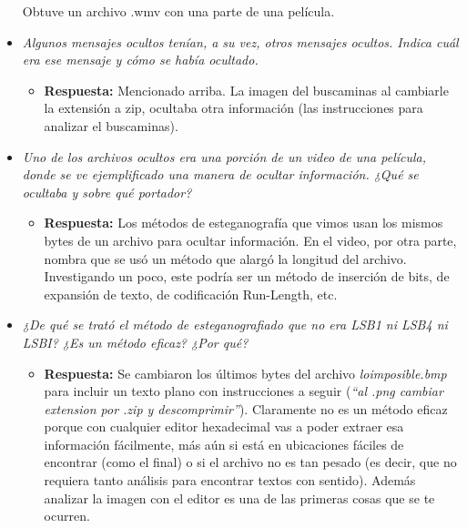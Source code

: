 \documentclass[a4paper,12pt]{article}
\begin{document}
\begin{itemize}
		
		Obtuve un archivo .wmv con una parte de una película.
		
		
		\item \textit{Algunos mensajes ocultos tenían, a su vez, otros mensajes ocultos. Indica cuál era ese mensaje y cómo se había ocultado.}
		\begin{itemize}
			\item \textbf{Respuesta:} Mencionado arriba. La imagen del buscaminas al cambiarle la extensión a zip, ocultaba otra información (las instrucciones para analizar el buscaminas).
		\end{itemize}
		
		\item \textit{Uno de los archivos ocultos era una porción de un video de una película, donde se ve ejemplificado una manera de ocultar información. ¿Qué se ocultaba y sobre qué portador?}
		\begin{itemize}
			\item \textbf{Respuesta:} Los métodos de esteganografía que vimos usan los mismos bytes de un archivo para ocultar información. En el video, por otra parte, nombra que se usó un método que alargó la longitud del archivo. Investigando un poco, este podría ser un método de inserción de bits, de expansión de texto, de codificación Run-Length, etc.
		\end{itemize}
		
		\item \textit{¿De qué se trató el método de esteganografiado que no era LSB1 ni LSB4 ni LSBI? ¿Es un método eficaz? ¿Por qué?}
		\begin{itemize}
			\item \textbf{Respuesta:} Se cambiaron los últimos bytes del archivo \textit{loimposible.bmp} para incluir un texto plano con instrucciones a seguir (\textit{``al .png cambiar extension por .zip y descomprimir''}). Claramente no es un método eficaz porque con cualquier editor hexadecimal vas a poder extraer esa información fácilmente, más aún si está en ubicaciones fáciles de encontrar (como el final) o si el archivo no es tan pesado (es decir, que no requiera tanto análisis para encontrar textos con sentido). Además analizar la imagen con el editor es una de las primeras cosas que se te ocurren.
		\end{itemize}
	
	\end{itemize}
	
\end{document}
